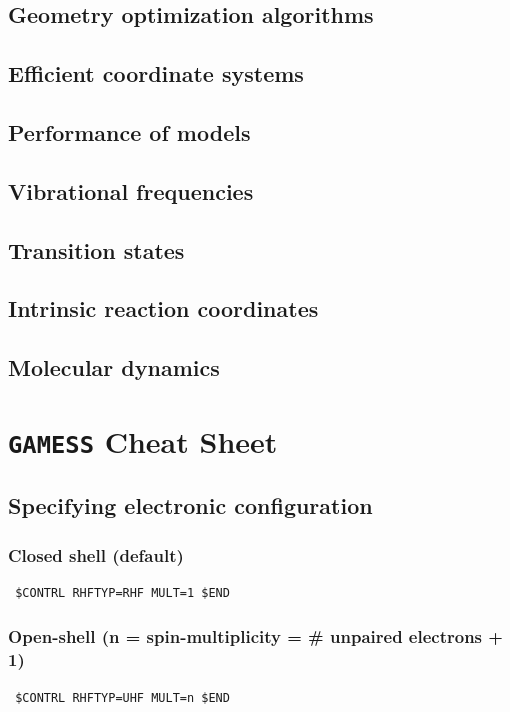 \documentclass[11pt]{article}
\begin{document}
\subsection{Geometry optimization algorithms}
\label{sec:org10ea73b}

\subsection{Efficient coordinate systems}
\label{sec:org5658ac7}
\subsection{Performance of models}
\label{sec:org8011326}
\subsection{Vibrational frequencies}
\label{sec:orgab5d065}
\subsection{Transition states}
\label{sec:org2362165}
\subsection{Intrinsic reaction coordinates}
\label{sec:org0e5666a}
\newpage

\subsection{Molecular dynamics}
\label{sec:org7ab8a31}

\section{\texttt{GAMESS} Cheat Sheet}
\label{sec:orga6202a8}
\subsection{Specifying electronic configuration}
\label{sec:org8eb76fa}
\subsubsection{Closed shell (default)}
\label{sec:orge7a98c0}
\begin{verbatim}
 $CONTRL RHFTYP=RHF MULT=1 $END
\end{verbatim}

\subsubsection{Open-shell (n = spin-multiplicity = \# unpaired electrons + 1)}
\label{sec:orgdf1f5df}
\begin{verbatim}
 $CONTRL RHFTYP=UHF MULT=n $END
\end{verbatim}
\end{document}
